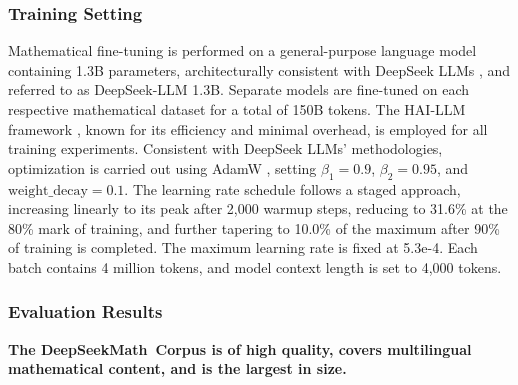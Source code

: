 \begin{itemize}[topsep=0pt]
\subsubsection{Training Setting}
\label{sec:quality-policy}
Mathematical fine-tuning is performed on a general-purpose language model containing 1.3B parameters, architecturally consistent with DeepSeek LLMs \citep{deepseek-llm}, and referred to as DeepSeek-LLM 1.3B. Separate models are fine-tuned on each respective mathematical dataset for a total of 150B tokens. The HAI-LLM framework \citep{haillm}, known for its efficiency and minimal overhead, is employed for all training experiments. Consistent with DeepSeek LLMs' methodologies, optimization is carried out using AdamW \citep{adamW}, setting $\beta_1=0.9$, $\beta_2=0.95$, and $\mathrm{weight\_decay}=0.1$. The learning rate schedule follows a staged approach, increasing linearly to its peak after 2,000 warmup steps, reducing to 31.6\% at the 80\% mark of training, and further tapering to 10.0\% of the maximum after 90\% of training is completed. The maximum learning rate is fixed at 5.3e-4. Each batch contains 4 million tokens, and model context length is set to 4,000 tokens.

\subsubsection{Evaluation Results}

\textbf{The DeepSeekMath~Corpus is of high quality, covers multilingual mathematical content, and is the largest in size.}


\end{itemize}
